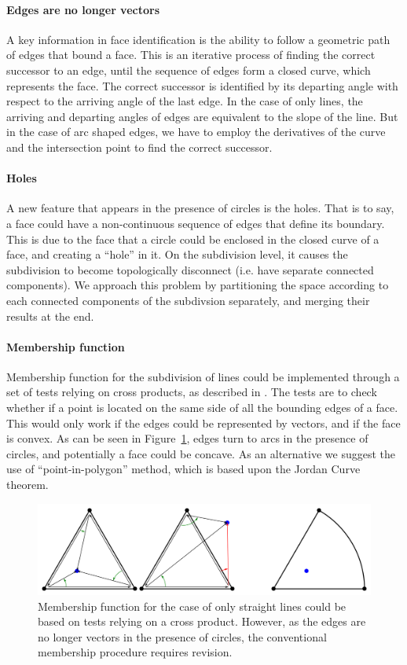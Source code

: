\paragraph{Edges are no longer vectors}
A key information in face identification is the ability to follow a geometric path of edges that bound a face.
This is an iterative process of finding the correct successor to an edge, until the sequence of edges form a closed curve, which represents the face.
The correct successor is identified by its departing angle with respect to the arriving angle of the last edge.
In the case of only lines, the arriving and departing angles of edges are equivalent to the slope of the line.
But in the case of arc shaped edges, we have to employ the derivatives of the curve and the intersection point to find the correct successor.

\paragraph{Holes}
A new feature that appears in the presence of circles is the holes.
That is to say, a face could have a non-continuous sequence of edges that define its boundary.
This is due to the face that a circle could be enclosed in the closed curve of a face, and creating a ``hole'' in it.
On the subdivision level, it causes the subdivision to become topologically disconnect (i.e. have separate connected components).
We approach this problem by partitioning the space according to each connected components of the subdivsion separately, and merging their results at the end.

\paragraph{Membership function}
Membership function for the subdivision of lines could be implemented through a set of tests relying on cross products, as described in \cite{de2000computational}.
The tests are to check whether if a point is located on the same side of all the bounding edges of a face.
This would only work if the edges could be represented by vectors, and if the face is convex.
As can be seen in Figure~\ref{fig:intro_crossProdFail}, edges turn to arcs in the presence of circles, and potentially a face could be concave.
As an alternative we suggest the use of ``point-in-polygon'' method, which is based upon the Jordan Curve theorem.

\begin{figure} %
    \centering
    \includegraphics[width=1.\textwidth]{figures/intro_crossProdFail.png}
    \caption{Membership function for the case of only straight lines could be based on tests relying on a cross product.
    However, as the edges are no longer vectors in the presence of circles, the conventional membership procedure requires revision.}
    \label{fig:intro_crossProdFail}
\end{figure}
